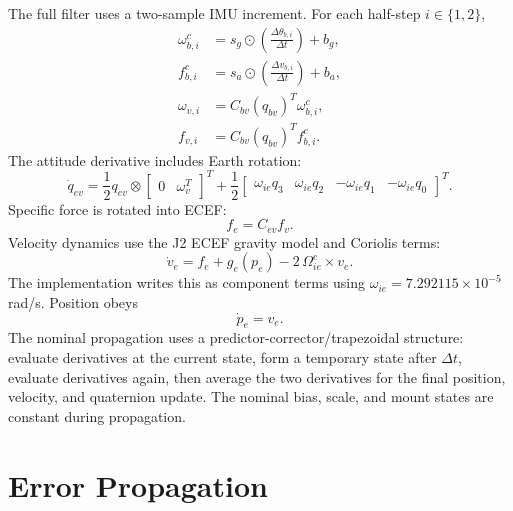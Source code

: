 \documentclass[11pt]{article}
\newcommand{\T}{^{T}}
\newcommand{\dt}{\Delta t}
\begin{document}
The full filter uses a two-sample IMU increment. For each half-step \(i\in
\{1,2\}\),
\begin{align}
  \omega_{b,i}^{c} &= s_g\odot\left(\frac{\Delta\theta_{b,i}}{\dt}\right)+b_g,\\
  f_{b,i}^{c} &= s_a\odot\left(\frac{\Delta v_{b,i}}{\dt}\right)+b_a,\\
  \omega_{v,i} &= C_{bv}(q_{bv})\T\omega_{b,i}^{c},\\
  f_{v,i} &= C_{bv}(q_{bv})\T f_{b,i}^{c}.
\end{align}
The attitude derivative includes Earth rotation:
\begin{equation}
  \dot q_{ev} =
  \frac{1}{2}q_{ev}\otimes
  \begin{bmatrix}0&\omega_v\T\end{bmatrix}\T
  +\frac{1}{2}
  \begin{bmatrix}
  \omega_{ie} q_3 &
  \omega_{ie} q_2 &
  -\omega_{ie} q_1 &
  -\omega_{ie} q_0
  \end{bmatrix}\T .
\end{equation}
Specific force is rotated into ECEF:
\begin{equation}
  f_e=C_{ev}f_v .
\end{equation}
Velocity dynamics use the J2 ECEF gravity model and Coriolis terms:
\begin{equation}
  \dot v_e =
  f_e + g_e(p_e) - 2\,\Omega_{ie}^{e}\times v_e .
\end{equation}
The implementation writes this as component terms using
\(\omega_{ie}=7.292115\times 10^{-5}\) rad/s. Position obeys
\begin{equation}
  \dot p_e=v_e .
\end{equation}
The nominal propagation uses a predictor-corrector/trapezoidal structure:
evaluate derivatives at the current state, form a temporary state after
\(\dt\), evaluate derivatives again, then average the two derivatives for the
final position, velocity, and quaternion update. The nominal bias, scale, and
mount states are constant during propagation.

\section{Error Propagation}
\end{document}

